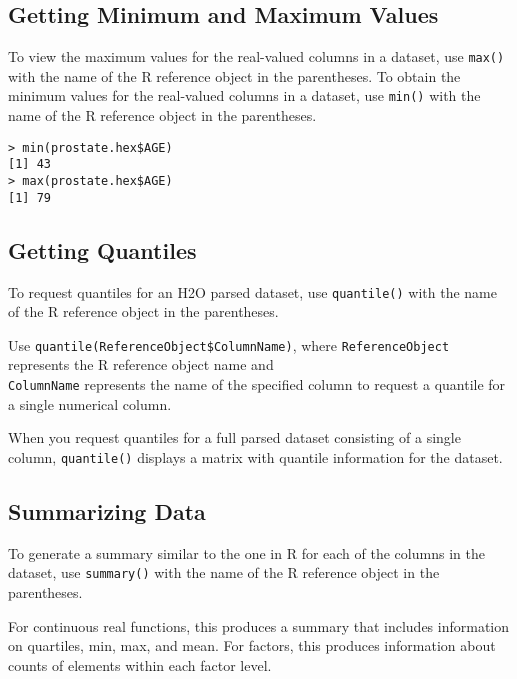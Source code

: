 {{\subsection{Getting Minimum and Maximum Values}

To view the maximum values for the real-valued columns in a dataset, use {\texttt{max()}} with the name of the R reference object in the parentheses.
To obtain the minimum values for the real-valued columns in a dataset, use {\texttt{min()}} with the name of the R reference object in the parentheses.

\waterExampleInR
\medskip

\begin{lstlisting}[style=R]
> min(prostate.hex$AGE)
[1] 43
> max(prostate.hex$AGE)
[1] 79
\end{lstlisting}

\subsection{Getting Quantiles}

To request quantiles for an H2O parsed dataset, use {\texttt{quantile()}} with the name of the R reference object in the parentheses.

Use  {\texttt{quantile(ReferenceObject\$ColumnName)}},  where {\texttt{ReferenceObject}} represents the R reference object name and \\{\texttt{ColumnName}} represents the name of the specified column to request a quantile for a single numerical column.

When you request quantiles for a full parsed dataset consisting of a single column, {\texttt{quantile()}} displays a matrix with quantile information for the dataset.

\newpage
\waterExampleInR
\medskip


\subsection{Summarizing Data}

To generate a summary similar to the one in R for each of the columns in the dataset, use {\texttt{summary()}} with the name of the R reference object in the parentheses.

For continuous real functions, this produces a summary that includes information on quartiles, min, max, and mean.
For factors, this produces information about counts of elements within each factor level.

}}
